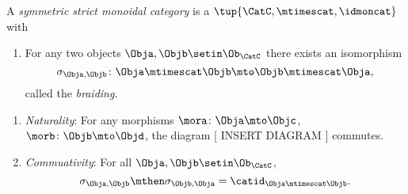 \begin{ctdefinition}
    \label{def:sym-strict-monoidal-semicat}
    A \emph{symmetric strict monoidal category} is a  $\tup{\CatC, \mtimescat, \idmoncat}$ with

    \constit

    \begin{enumerate}
        \item For any two objects $\Obja, \Objb \setin \Ob_\CatC$ there exists an isomorphism
              \begin{equation}
                  \sigma_{\Obja, \Objb} \colon \Obja \mtimescat   \Objb \mto \Objb \mtimescat   \Obja,
              \end{equation}
              called the \emph{braiding}.
    \end{enumerate}

    \condit

    \begin{enumerate}
        \item \emph{Naturality}: For any morphisms $\mora \colon \Obja \mto \Objc$, $\morb \colon \Objb \mto \Objd$, the diagram
                  [ INSERT DIAGRAM ]
              commutes.
        \item \emph{Commuativity}: For all $\Obja, \Objb \setin \Ob_\CatC$,
              \begin{equation}
                  \sigma_{\Obja, \Objb} \mthen \sigma_{\Objb, \Obja} = \catid_{\Obja \mtimescat   \Objb}.
              \end{equation}
    \end{enumerate}

\end{ctdefinition}




